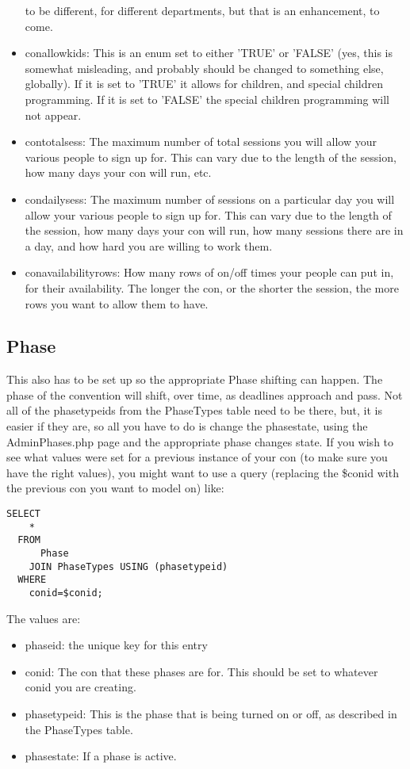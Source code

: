 \documentclass[captions=tablesignature]{scrartcl}
\begin{document}
\begin{itemize}
to be different, for different departments, but that is an
enhancement, to come.
\item conallowkids: This is an enum set to either 'TRUE' or 'FALSE'
(yes, this is somewhat misleading, and probably should be changed
to something else, globally).  If it is set to 'TRUE' it allows
for children, and special children programming.  If it is set to
'FALSE' the special children programming will not appear.
\item contotalsess: The maximum number of total sessions you will allow
your various people to sign up for.  This can vary due to the
length of the session, how many days your con will run, etc.
\item condailysess: The maximum number of sessions on a particular day
you will allow your various people to sign up for.  This can vary
due to the length of the session, how many days your con will
run, how many sessions there are in a day, and how hard you are
willing to work them.
\item conavailabilityrows: How many rows of on/off times your people
can put in, for their availability.  The longer the con, or the
shorter the session, the more rows you want to allow them to
have.
\end{itemize}

\subsection{Phase}
\label{sec-10-2}
This also has to be set up so the appropriate Phase shifting can
happen.  The phase of the convention will shift, over time, as
deadlines approach and pass.  Not all of the phasetypeids from the
PhaseTypes table need to be there, but, it is easier if they are,
so all you have to do is change the phasestate, using the
AdminPhases.php page and the appropriate phase changes state.  If
you wish to see what values were set for a previous instance of
your con (to make sure you have the right values), you might want
to use a query (replacing the \$conid with the previous con you want
to model on) like:
\begin{verbatim}
SELECT
    *
  FROM
      Phase
    JOIN PhaseTypes USING (phasetypeid)
  WHERE
    conid=$conid;
\end{verbatim}
The values are:
\begin{itemize}
\item phaseid: the unique key for this entry
\item conid: The con that these phases are for.  This should be set to
whatever conid you are creating.
\item phasetypeid: This is the phase that is being turned on or off, as
described in the PhaseTypes table.
\item phasestate: If a phase is active.
\end{itemize}
\end{document}

